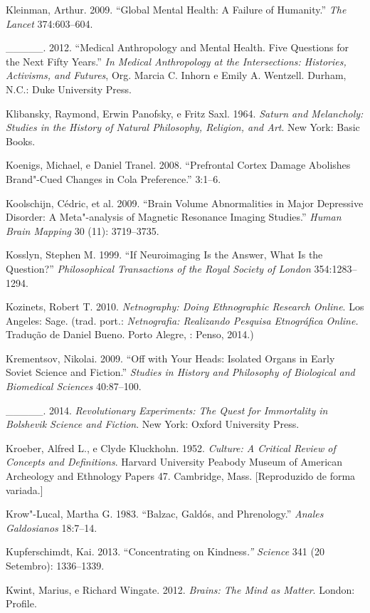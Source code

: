 {\begin{Parskip}
Kleinman, Arthur. 2009. ``Global Mental Health: A Failure of Humanity.''
\emph{The Lancet} 374:603--604.

\_\_\_\_\_. 2012. ``Medical Anthropology and Mental Health. Five
Questions for the Next Fifty Years.'' \emph{In Medical Anthropology at
the Intersections: Histories, Activisms, and Futures}, Org. Marcia C.
Inhorn e Emily A. Wentzell. Durham, N.C.: Duke University Press.

Klibansky, Raymond, Erwin Panofsky, e Fritz Saxl. 1964. \emph{Saturn and
Melancholy: Studies in the History of Natural Philosophy, Religion, and
Art}. New York: Basic Books.

Koenigs, Michael, e Daniel Tranel. 2008. ``Prefrontal Cortex Damage
Abolishes Brand"-Cued Changes in Cola Preference.'' \emph{} 3:1--6.

Koolschijn, Cédric, et al. 2009. ``Brain Volume Abnormalities in Major
Depressive Disorder: A Meta"-analysis of Magnetic Resonance Imaging
Studies.'' \emph{Human Brain Mapping} 30 (11): 3719--3735.

Kosslyn, Stephen M. 1999. ``If Neuroimaging Is the Answer, What Is the
Question?'' \emph{Philosophical Transactions of the Royal Society of
London} 354:1283--1294.

Kozinets, Robert T. 2010. \emph{Netnography: Doing Ethnographic Research
Online}. Los Angeles: Sage. (trad. port.: \emph{Netnografia: Realizando
Pesquisa Etnográfica Online.} Tradução de Daniel Bueno. Porto Alegre,
: Penso, 2014.)

Krementsov, Nikolai. 2009. ``Off with Your Heads: Isolated Organs in
Early Soviet Science and Fiction.'' \emph{Studies in History and
Philosophy of Biological and Biomedical Sciences} 40:87--100.

\_\_\_\_\_. 2014. \emph{Revolutionary Experiments: The Quest for
Immortality in Bolshevik Science and Fiction}. New York: Oxford
University Press.

Kroeber, Alfred L., e Clyde Kluckhohn. 1952. \emph{Culture: A Critical
Review of Concepts and Definitions}. Harvard University Peabody Museum
of American Archeology and Ethnology Papers 47. Cambridge, Mass.
{[}Reproduzido de forma variada.{]}

Krow"-Lucal, Martha G. 1983. ``Balzac, Galdós, and Phrenology.''
\emph{Anales Galdosianos} 18:7--14.

Kupferschimdt, Kai. 2013. ``Concentrating on Kindness\emph{.'' Science}
341 (20 Setembro): 1336--1339.

Kwint, Marius, e Richard Wingate. 2012. \emph{Brains: The Mind as
Matter}. London: Profile.


\end{Parskip}}
